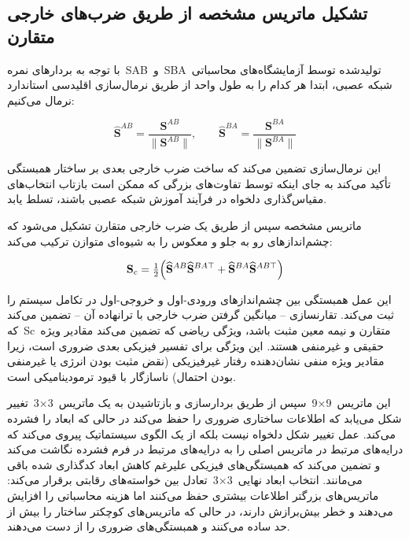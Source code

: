 \documentclass[12pt, a4paper]{article}
\begin{document}
\subsection{تشکیل ماتریس مشخصه از طریق ضرب‌های خارجی متقارن}

با توجه به بردارهای نمره SAB و SBA تولیدشده توسط آزمایشگاه‌های محاسباتی شبکه عصبی، ابتدا هر کدام را به طول واحد از طریق نرمال‌سازی اقلیدسی استاندارد نرمال می‌کنیم:

\begin{equation}
\widehat{\mathbf{S}}^{AB}=\frac{\mathbf{S}^{AB}}{\lVert\mathbf{S}^{AB}\rVert},\qquad \widehat{\mathbf{S}}^{BA}=\frac{\mathbf{S}^{BA}}{\lVert\mathbf{S}^{BA}\rVert}
\end{equation}

این نرمال‌سازی تضمین می‌کند که ساخت ضرب خارجی بعدی بر ساختار همبستگی تأکید می‌کند به جای اینکه توسط تفاوت‌های بزرگی که ممکن است بازتاب انتخاب‌های مقیاس‌گذاری دلخواه در فرآیند آموزش شبکه عصبی باشند، تسلط یابد.

ماتریس مشخصه سپس از طریق یک ضرب خارجی متقارن تشکیل می‌شود که چشم‌اندازهای رو به جلو و معکوس را به شیوه‌ای متوازن ترکیب می‌کند:

\begin{equation}
\mathbf{S}_{c}=\tfrac{1}{2}\Bigl(\widehat{\mathbf{S}}^{AB}\widehat{\mathbf{S}}^{BA\top}+\widehat{\mathbf{S}}^{BA}\widehat{\mathbf{S}}^{AB\top}\Bigr)
\end{equation}

این عمل همبستگی بین چشم‌اندازهای ورودی-اول و خروجی-اول در تکامل سیستم را ثبت می‌کند. تقارنسازی – میانگین گرفتن ضرب خارجی با ترانهاده آن – تضمین می‌کند که Sc متقارن و نیمه معین مثبت باشد، ویژگی ریاضی که تضمین می‌کند مقادیر ویژه حقیقی و غیرمنفی هستند. این ویژگی برای تفسیر فیزیکی بعدی ضروری است، زیرا مقادیر ویژه منفی نشان‌دهنده رفتار غیرفیزیکی (نقض مثبت بودن انرژی یا غیرمنفی بودن احتمال) ناسازگار با قیود ترمودینامیکی است.

این ماتریس 9×9 سپس از طریق بردارسازی و بازتاشیدن به یک ماتریس 3×3 تغییر شکل می‌یابد که اطلاعات ساختاری ضروری را حفظ می‌کند در حالی که ابعاد را فشرده می‌کند. عمل تغییر شکل دلخواه نیست بلکه از یک الگوی سیستماتیک پیروی می‌کند که درایه‌های مرتبط در ماتریس اصلی را به درایه‌های مرتبط در فرم فشرده نگاشت می‌کند و تضمین می‌کند که همبستگی‌های فیزیکی علیرغم کاهش ابعاد کدگذاری شده باقی می‌مانند. انتخاب ابعاد نهایی 3×3 تعادل بین خواسته‌های رقابتی برقرار می‌کند: ماتریس‌های بزرگتر اطلاعات بیشتری حفظ می‌کنند اما هزینه محاسباتی را افزایش می‌دهند و خطر بیش‌برازش دارند، در حالی که ماتریس‌های کوچکتر ساختار را بیش از حد ساده می‌کنند و همبستگی‌های ضروری را از دست می‌دهند.
\end{document}
